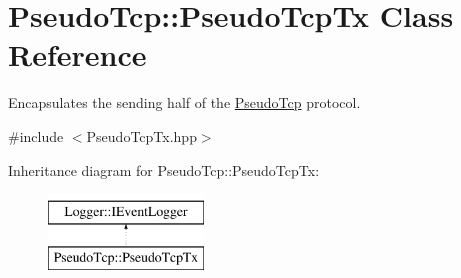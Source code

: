 \hypertarget{classPseudoTcp_1_1PseudoTcpTx}{
\section{PseudoTcp::PseudoTcpTx Class Reference}
\label{classPseudoTcp_1_1PseudoTcpTx}
}


Encapsulates the sending half of the \hyperlink{namespacePseudoTcp}{PseudoTcp} protocol.  




{\ttfamily \#include $<$PseudoTcpTx.hpp$>$}

Inheritance diagram for PseudoTcp::PseudoTcpTx:\begin{figure}[H]
\begin{center}
\leavevmode
\includegraphics[height=2cm]{classPseudoTcp_1_1PseudoTcpTx}
\end{center}
\end{figure}
